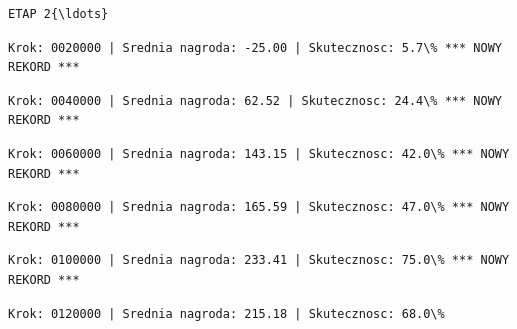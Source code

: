 \documentclass[11pt]{article}
\begin{document}
    
    \begin{Verbatim}[commandchars=\\\{\}]
ETAP 2{\ldots}

    \end{Verbatim}

    
    
    \begin{Verbatim}[commandchars=\\\{\}]
Krok: 0020000 | Srednia nagroda: -25.00 | Skutecznosc: 5.7\% *** NOWY REKORD ***

    \end{Verbatim}

    
    
    \begin{Verbatim}[commandchars=\\\{\}]
Krok: 0040000 | Srednia nagroda: 62.52 | Skutecznosc: 24.4\% *** NOWY REKORD ***

    \end{Verbatim}

    
    
    \begin{Verbatim}[commandchars=\\\{\}]
Krok: 0060000 | Srednia nagroda: 143.15 | Skutecznosc: 42.0\% *** NOWY REKORD ***

    \end{Verbatim}

    
    
    \begin{Verbatim}[commandchars=\\\{\}]
Krok: 0080000 | Srednia nagroda: 165.59 | Skutecznosc: 47.0\% *** NOWY REKORD ***

    \end{Verbatim}

    
    
    \begin{Verbatim}[commandchars=\\\{\}]
Krok: 0100000 | Srednia nagroda: 233.41 | Skutecznosc: 75.0\% *** NOWY REKORD ***

    \end{Verbatim}

    
    
    \begin{Verbatim}[commandchars=\\\{\}]
Krok: 0120000 | Srednia nagroda: 215.18 | Skutecznosc: 68.0\%

    \end{Verbatim}
\end{document}
